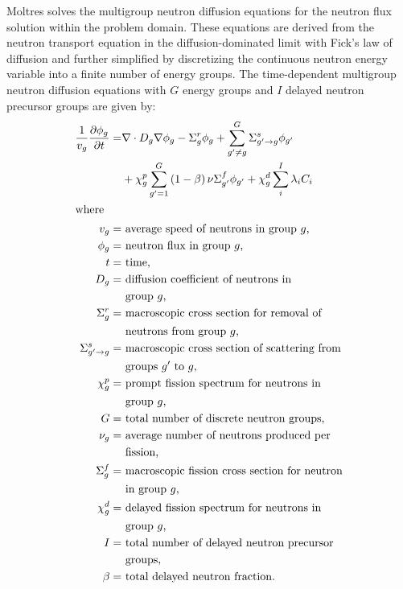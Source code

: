 Moltres solves the multigroup neutron diffusion equations for the neutron
flux solution within the problem domain. These equations are derived from the
neutron transport
equation in the diffusion-dominated limit with Fick's law of diffusion and
further simplified by discretizing the continuous neutron energy variable into
a finite number of energy groups. The time-dependent multigroup neutron
diffusion equations with $G$ energy groups and $I$ delayed neutron precursor
groups are given by:
%
\begin{align}
    \frac{1}{v_g} \frac{\partial \phi_g}{\partial t} =& \nabla \cdot D_g
    \nabla \phi_g - \Sigma^r_g \phi_g +
    \sum^G_{g' \neq g} \Sigma^s_{g' \rightarrow g} \phi_{g'} \nonumber \\
    &+ \chi^p_g \sum^G_{g'=1} \left( 1-\beta \right) \nu \Sigma^f_{g'}
    \phi_{g'} + \chi^d_g \sum^I_i \lambda_i C_i \label{eq:neutron} \\
    \shortintertext{where}
    v_g =& \text{ average speed of neutrons in group $g$,} 
    \nonumber \\
    \phi_g =& \text{ neutron flux in group $g$,}
    \nonumber \\
    t =& \text{ time,} \nonumber \\
    D_g =& \text{ diffusion coefficient of neutrons in} \nonumber \\
    &\text{ group $g$,} \nonumber \\
    \Sigma^r_g =& \text{ macroscopic cross section for removal of} \nonumber \\
    &\text{ neutrons from group $g$,} \nonumber \\
    \Sigma^s_{g' \rightarrow g} =& \text{ macroscopic cross section of
    scattering from} \nonumber \\
    &\text{ groups $g'$ to $g$,} \nonumber \\
    \chi^p_g =& \text{ prompt fission spectrum for neutrons in} \nonumber \\
    &\text{ group $g$,} \nonumber \\
    G =& \text{ total number of discrete neutron groups,} \nonumber \\
    \nu_g =& \text{ average number of neutrons produced per} \nonumber \\
    &\text{ fission,} \nonumber \\
    \Sigma^f_{g} =& \text{ macroscopic fission cross section for neutron}
    \nonumber \\
    &\text{ in group $g$,} \nonumber \\
    \chi^d_g =& \text{ delayed fission spectrum for neutrons in} \nonumber \\
    &\text{ group $g$,} \nonumber \\
    I =& \text{ total number of delayed neutron precursor} \nonumber \\
    &\text{ groups,} \nonumber \\
    \beta =& \text{ total delayed neutron fraction.} \nonumber
\end{align}

